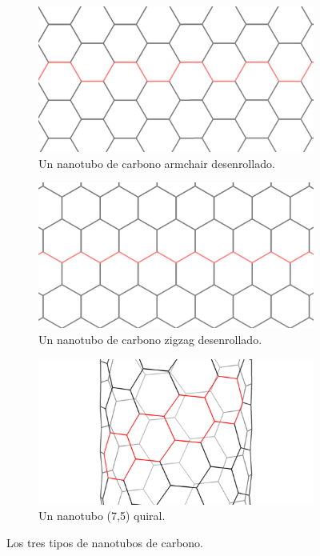 \begin{figure}[!hbt]
\begin{subfigure}{.5\textwidth}
  \centering
  \includegraphics[width=.8\linewidth]{armchair.png}  
  \caption{Un nanotubo de carbono armchair desenrollado.}
  \label{fig:armchair}
\end{subfigure}
\begin{subfigure}{.5\textwidth}
  \centering
  \includegraphics[width=.8\linewidth]{zigzag.png}  
  \caption{Un nanotubo de carbono zigzag desenrollado.}
  \label{fig:zigzag}
\end{subfigure}
\begin{subfigure}{1\textwidth}
  \centering
  \includegraphics[width=.7\linewidth]{quiral.png}  
  \caption{Un nanotubo (7,5) quiral.}
  \label{fig:quiral}
\end{subfigure}
\caption{Los tres tipos de nanotubos de carbono.}
\label{fig:CNTsbygeometry}
\end{figure}

